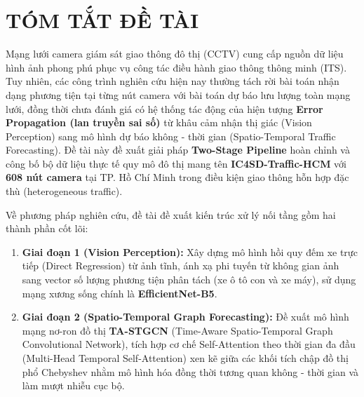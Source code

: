 \documentclass[12pt,a4paper,oneside]{report}
\begin{document}
\chapter*{TÓM TẮT ĐỀ TÀI}

Mạng lưới camera giám sát giao thông đô thị (CCTV) cung cấp nguồn dữ liệu hình ảnh phong phú phục vụ công tác điều hành giao thông thông minh (ITS). Tuy nhiên, các công trình nghiên cứu hiện nay thường tách rời bài toán nhận dạng phương tiện tại từng nút camera với bài toán dự báo lưu lượng toàn mạng lưới, đồng thời chưa đánh giá có hệ thống tác động của hiện tượng \textbf{Error Propagation (lan truyền sai số)} từ khâu cảm nhận thị giác (Vision Perception) sang mô hình dự báo không - thời gian (Spatio-Temporal Traffic Forecasting). Đề tài này đề xuất giải pháp \textbf{Two-Stage Pipeline} hoàn chỉnh và công bố bộ dữ liệu thực tế quy mô đô thị mang tên \textbf{IC4SD-Traffic-HCM} với \textbf{608 nút camera} tại TP. Hồ Chí Minh trong điều kiện giao thông hỗn hợp đặc thù (heterogeneous traffic).

Về phương pháp nghiên cứu, đề tài đề xuất kiến trúc xử lý nối tầng gồm hai thành phần cốt lõi:
\begin{enumerate}
    \item \textbf{Giai đoạn 1 (Vision Perception):} Xây dựng mô hình hồi quy đếm xe trực tiếp (Direct Regression) từ ảnh tĩnh, ánh xạ phi tuyến từ không gian ảnh sang vector số lượng phương tiện phân tách (xe ô tô con và xe máy), sử dụng mạng xương sống chính là \textbf{EfficientNet-B5}.
    \item \textbf{Giai đoạn 2 (Spatio-Temporal Graph Forecasting):} Đề xuất mô hình mạng nơ-ron đồ thị \textbf{TA-STGCN} (Time-Aware Spatio-Temporal Graph Convolutional Network), tích hợp cơ chế Self-Attention theo thời gian đa đầu (Multi-Head Temporal Self-Attention) xen kẽ giữa các khối tích chập đồ thị phổ Chebyshev nhằm mô hình hóa đồng thời tương quan không - thời gian và làm mượt nhiễu cục bộ.
\end{enumerate}
\end{document}
